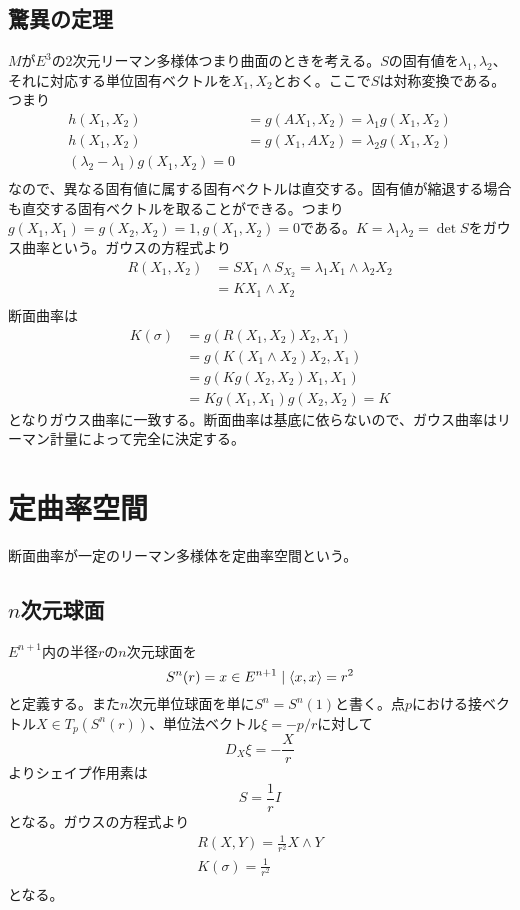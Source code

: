     \subsection{驚異の定理}

        $M$が$E^3$の2次元リーマン多様体つまり曲面のときを考える。$S$の固有値を$\lambda_1, \lambda_2$、それに対応する単位固有ベクトルを$X_1, X_2$とおく。ここで$S$は対称変換である。つまり
        \begin{align*}
            h(X_1, X_2) &= g(AX_1, X_2) = \lambda_1g(X_1, X_2)\\
            h(X_1, X_2) &= g(X_1, AX_2) = \lambda_2g(X_1, X_2)\\
            (\lambda_2 - \lambda_1)g(X_1, X_2) = 0\\
        \end{align*}
        なので、異なる固有値に属する固有ベクトルは直交する。固有値が縮退する場合も直交する固有ベクトルを取ることができる。つまり$g(X_1, X_1) = g(X_2, X_2) = 1, g(X_1, X_2) = 0$である。$K = \lambda_1\lambda_2 = \det S$をガウス曲率という。ガウスの方程式より
        \begin{align*}
            R(X_1, X_2)
            &= SX_1 \wedge S_X_2 = \lambda_1X_1 \wedge \lambda_2X_2\\
            &= KX_1 \wedge X_2\\
        \end{align*}
        断面曲率は
        \begin{align*}
            K(\sigma) &= g(R(X_1, X_2)X_2, X_1)\\
            &= g(K(X_1 \wedge X_2)X_2, X_1)\\
            &= g(Kg(X_2, X_2)X_1, X_1)\\
            &= Kg(X_1, X_1)g(X_2, X_2) = K
        \end{align*}
        となりガウス曲率に一致する。断面曲率は基底に依らないので、ガウス曲率はリーマン計量によって完全に決定する。

\section{定曲率空間}
    断面曲率が一定のリーマン多様体を定曲率空間という。
    \subsection{$n$次元球面}
        $E^{n+1}$内の半径$r$の$n$次元球面を
            \[S^n(r) = {x \in E^{n+1} \mid \langle x, x\rangle = r^2}\]
        と定義する。また$n$次元単位球面を単に$S^n = S^n(1)$と書く。点$p$における接ベクトル$X \in T_p(S^n(r))$、単位法ベクトル$\xi = -p/r$に対して
            \[D_X\xi = -\frac{X}{r}\]
        よりシェイプ作用素は
            \[S = \frac{1}{r}I\]
        となる。ガウスの方程式より
        \begin{align*}
            R(X, Y) = \frac{1}{r^2}X \wedge Y\\
            K(\sigma) = \frac{1}{r^2}\\
        \end{align*}
        となる。

